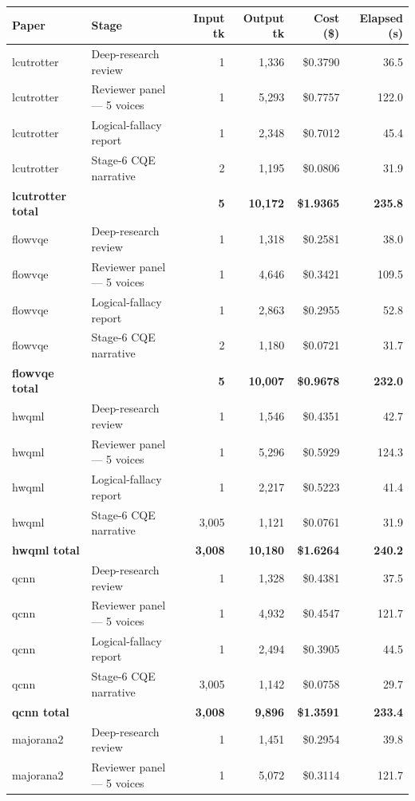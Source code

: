 \documentclass[10pt,letterpaper]{article}
\begin{document}
\begin{tabular}{llrrrr}
\toprule
Paper & Stage & Input tk & Output tk & Cost (\$) & Elapsed (s) \\
\midrule
lcutrotter & Deep-research review & 1 & 1,336 & \$0.3790 & 36.5 \\
lcutrotter & Reviewer panel — 5 voices & 1 & 5,293 & \$0.7757 & 122.0 \\
lcutrotter & Logical-fallacy report & 1 & 2,348 & \$0.7012 & 45.4 \\
lcutrotter & Stage-6 CQE narrative & 2 & 1,195 & \$0.0806 & 31.9 \\
\textbf{lcutrotter total} & & \textbf{5} & \textbf{10,172} & \textbf{\$1.9365} & \textbf{235.8} \\
\midrule
flowvqe & Deep-research review & 1 & 1,318 & \$0.2581 & 38.0 \\
flowvqe & Reviewer panel — 5 voices & 1 & 4,646 & \$0.3421 & 109.5 \\
flowvqe & Logical-fallacy report & 1 & 2,863 & \$0.2955 & 52.8 \\
flowvqe & Stage-6 CQE narrative & 2 & 1,180 & \$0.0721 & 31.7 \\
\textbf{flowvqe total} & & \textbf{5} & \textbf{10,007} & \textbf{\$0.9678} & \textbf{232.0} \\
\midrule
hwqml & Deep-research review & 1 & 1,546 & \$0.4351 & 42.7 \\
hwqml & Reviewer panel — 5 voices & 1 & 5,296 & \$0.5929 & 124.3 \\
hwqml & Logical-fallacy report & 1 & 2,217 & \$0.5223 & 41.4 \\
hwqml & Stage-6 CQE narrative & 3,005 & 1,121 & \$0.0761 & 31.9 \\
\textbf{hwqml total} & & \textbf{3,008} & \textbf{10,180} & \textbf{\$1.6264} & \textbf{240.2} \\
\midrule
qcnn & Deep-research review & 1 & 1,328 & \$0.4381 & 37.5 \\
qcnn & Reviewer panel — 5 voices & 1 & 4,932 & \$0.4547 & 121.7 \\
qcnn & Logical-fallacy report & 1 & 2,494 & \$0.3905 & 44.5 \\
qcnn & Stage-6 CQE narrative & 3,005 & 1,142 & \$0.0758 & 29.7 \\
\textbf{qcnn total} & & \textbf{3,008} & \textbf{9,896} & \textbf{\$1.3591} & \textbf{233.4} \\
\midrule
majorana2 & Deep-research review & 1 & 1,451 & \$0.2954 & 39.8 \\
majorana2 & Reviewer panel — 5 voices & 1 & 5,072 & \$0.3114 & 121.7 \\

\end{tabular}
\end{document}
